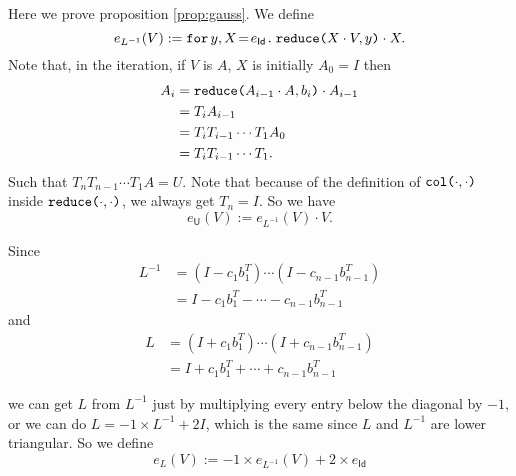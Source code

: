 Here we prove proposition \ref{prop:gauss}. We define
$$
e_{L^{-1}}(V) :=  \initf{e_{\mathsf{Id}}}{y}{X}{\red{X\cdot V}{y}\cdot X}.
$$
Note that, in the iteration, if $V$ is $A$, $X$ is initially $A_0=I$ then
\begin{align*}
  A_i&=\red{A_{i-1}\cdot A}{b_i}\cdot A_{i-1} \\
  &=T_iA_{i-1} \\
  &=T_iT_{i-1}\cdots T_1A_0 \\
  &=T_iT_{i-1}\cdots T_1.
\end{align*}
Such that $T_nT_{n-1}\cdots T_1A=U$. Note that because of the definition of $\ccol{\cdot}{\cdot}$ inside $\red{\cdot}{\cdot}$, we always get $T_n=I$.
So we have
$$
e_{\mathsf{U}}(V) :=  e_{L^{-1}}(V) \cdot V.
$$ 

Since
\begin{align*}
  L^{-1}&=(I-c_1b_1^T)\cdots (I-c_{n-1}b_{n-1}^T) \\
  &=I-c_1b_1^T-\cdots - c_{n-1}b_{n-1}^T
\end{align*}
and
\begin{align*}
  L&=(I+c_1b_1^T)\cdots (I+c_{n-1}b_{n-1}^T) \\
  &=I+c_1b_1^T+\cdots + c_{n-1}b_{n-1}^T
\end{align*}

we can get $L$ from $L^{-1}$ just by multiplying every entry below the diagonal by $-1$, or we can do $L=-1\times L^{-1} + 2I$, which is the same since $L$ and $L^{-1}$ are lower triangular. So we define
$$
e_{L}(V) :=  -1\times e_{L^{-1}}(V) + 2\times e_{\mathsf{Id}}
$$